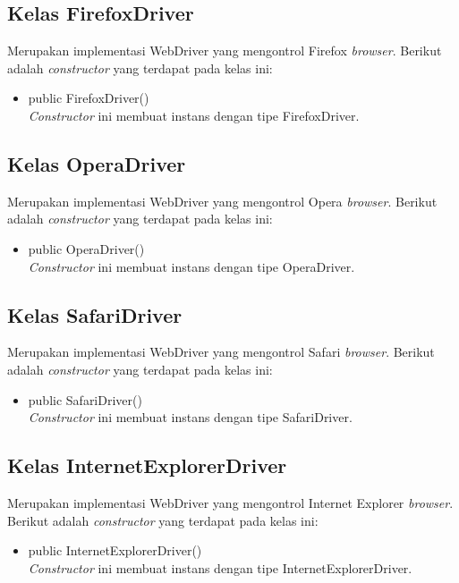 \subsection{Kelas FirefoxDriver}
\label{subsec:firefoxdriver}
Merupakan implementasi WebDriver yang mengontrol Firefox \textit{browser}. Berikut adalah \textit{constructor} yang terdapat pada kelas ini:
\begin{itemize}
\item public FirefoxDriver()\\
\textit{Constructor} ini membuat instans dengan tipe FirefoxDriver.
\end{itemize}

\subsection{Kelas OperaDriver}
\label{subsec:operadriver}
Merupakan implementasi WebDriver yang mengontrol Opera \textit{browser}. Berikut adalah \textit{constructor} yang terdapat pada kelas ini:
\begin{itemize}
\item public OperaDriver()\\
\textit{Constructor} ini membuat instans dengan tipe OperaDriver.
\end{itemize}

\subsection{Kelas SafariDriver}
\label{subsec:safaridriver}
Merupakan implementasi WebDriver yang mengontrol Safari \textit{browser}. Berikut adalah \textit{constructor} yang terdapat pada kelas ini:
\begin{itemize}
\item public SafariDriver()\\
\textit{Constructor} ini membuat instans dengan tipe SafariDriver.
\end{itemize}

\subsection{Kelas InternetExplorerDriver}
\label{subsec:internetexplorerdriver}
Merupakan implementasi WebDriver yang mengontrol Internet Explorer \textit{browser}. Berikut adalah \textit{constructor} yang terdapat pada kelas ini:
\begin{itemize}
\item public InternetExplorerDriver()\\
\textit{Constructor} ini membuat instans dengan tipe InternetExplorerDriver.
\end{itemize}

